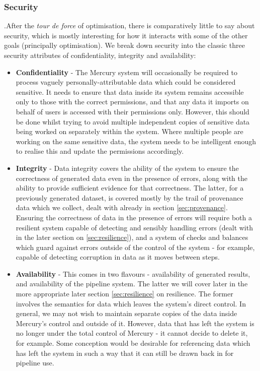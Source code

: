 \documentclass[10pt,a4paper]{article}
\newcounter{paracounter}
\newcommand{\npar}{\par\noindent\refstepcounter{paracounter}\theparacounter.\space}
\begin{document}
\subsubsection{Security}
\npar After the \textit{tour de force} of optimisation, there is comparatively little to say about security, which is mostly interesting for how it interacts with some of the other goals (principally optimisation). We break down security into the classic three security attributes of confidentiality, integrity and availability:
\begin{itemize}
\item \textbf{Confidentiality} - The Mercury system will occasionally be required to process vaguely personally-attributable data which could be considered sensitive. It needs to ensure that data inside its system remains accessible only to those with the correct permissions, and that any data it imports on behalf of users is accessed with their permissions only. However, this should be done whilst trying to avoid multiple independent copies of sensitive data being worked on separately within the system. Where multiple people are working on the same sensitive data, the system needs to be intelligent enough to realise this and update the permissions accordingly.
\item \textbf{Integrity} - Data integrity covers the ability of the system to ensure the correctness of generated data even in the presence of errors, along with the ability to provide sufficient evidence for that correctness. The latter, for a previously generated dataset, is covered mostly by the trail of provenance data which we collect, dealt with already in section \ref{sec:provenance}. Ensuring the correctness of data in the presence of errors will require both a resilient system capable of detecting and sensibly handling errors (dealt with in the later section on \ref{sec:resilience}), and a system of checks and balances which guard against errors outside of the control of the system - for example, capable of detecting corruption in data as it moves between steps.
\item \textbf{Availability} - This comes in two flavours - availability of generated results, and availability of the pipeline system. The latter we will cover later in the more appropriate later section \ref{sec:resilience} on resilience. The former involves the semantics for data which leaves the system's direct control. In general, we may not wish to maintain separate copies of the data inside Mercury's control and outside of it. However, data that has left the system is no longer under the total control of Mercury - it cannot decide to delete it, for example. Some conception would be desirable for referencing data which has left the system in such a way that it can still be drawn back in for pipeline use.
\end{itemize}
\end{document}
